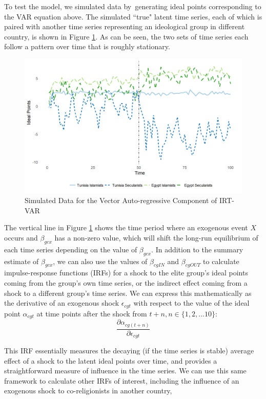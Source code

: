 \documentclass[12pt]{article}
\begin{document}
 To test the model, we simulated data by generating ideal points corresponding to the VAR equation above. The simulated ``true" latent time series, each of which is paired with another time series representing an ideological group in different country, is shown in Figure \ref{sim_data}. As can be seen, the two sets of time series each follow a pattern over time that is roughly stationary.
 \begin{figure}[!h]
 	\caption{Simulated Data for the Vector Auto-regressive Component of IRT-VAR}\label{sim_data}
 	\centering
	\includegraphics[width=.9\linewidth]{ecm_example.png}
 \end{figure}

The vertical line in Figure \ref{sim_data} shows the time period where an exogenous event $X$ occurs and $\beta_{gcx}$ has a non-zero value, which will shift the long-run equilibrium of each time series depending on the value of $\beta_{gcx}$. In addition to the summary estimate of $\beta_{gcx}$, we can also use the values of $\beta_{cgIN}$ and $\beta_{cgOUT}$ to calculate impulse-response functions (IRFs) for a shock to the elite group's ideal points coming from the group's own time series, or the indirect effect coming from a shock to a different group's time series. We can express this mathematically as the derivative of an exogenous shock $\epsilon_{cgt}$ with respect to the value of the ideal point $\alpha_{cgt}$ at time points after the shock from $t+n, n\in \{1,2,...10\}$:
\begin{equation}
\frac{\partial \alpha_{cg(t+n)}}{\partial \epsilon_{cgt}}
\end{equation}

This IRF essentially measures the decaying (if the time series is stable) average effect of a shock to the latent ideal points over time, and provides a straightforward measure of influence in the time series. We can use this same framework to calculate other IRFs of interest, including the influence of an exogenous shock to co-religionists in another country,
\end{document}
